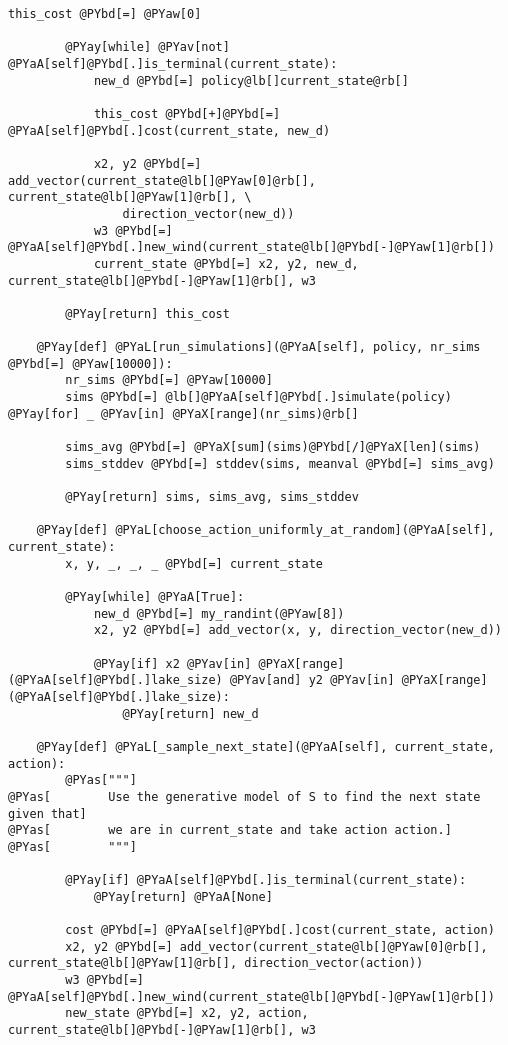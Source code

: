 \begin{Verbatim}[commandchars=@\[\]]
        this_cost @PYbd[=] @PYaw[0]

        @PYay[while] @PYav[not] @PYaA[self]@PYbd[.]is_terminal(current_state):
            new_d @PYbd[=] policy@lb[]current_state@rb[]

            this_cost @PYbd[+]@PYbd[=] @PYaA[self]@PYbd[.]cost(current_state, new_d)

            x2, y2 @PYbd[=] add_vector(current_state@lb[]@PYaw[0]@rb[], current_state@lb[]@PYaw[1]@rb[], \
                direction_vector(new_d))
            w3 @PYbd[=] @PYaA[self]@PYbd[.]new_wind(current_state@lb[]@PYbd[-]@PYaw[1]@rb[])
            current_state @PYbd[=] x2, y2, new_d, current_state@lb[]@PYbd[-]@PYaw[1]@rb[], w3

        @PYay[return] this_cost

    @PYay[def] @PYaL[run_simulations](@PYaA[self], policy, nr_sims @PYbd[=] @PYaw[10000]):
        nr_sims @PYbd[=] @PYaw[10000]
        sims @PYbd[=] @lb[]@PYaA[self]@PYbd[.]simulate(policy) @PYay[for] _ @PYav[in] @PYaX[range](nr_sims)@rb[]

        sims_avg @PYbd[=] @PYaX[sum](sims)@PYbd[/]@PYaX[len](sims)
        sims_stddev @PYbd[=] stddev(sims, meanval @PYbd[=] sims_avg)

        @PYay[return] sims, sims_avg, sims_stddev

    @PYay[def] @PYaL[choose_action_uniformly_at_random](@PYaA[self], current_state):
        x, y, _, _, _ @PYbd[=] current_state

        @PYay[while] @PYaA[True]:
            new_d @PYbd[=] my_randint(@PYaw[8])
            x2, y2 @PYbd[=] add_vector(x, y, direction_vector(new_d))

            @PYay[if] x2 @PYav[in] @PYaX[range](@PYaA[self]@PYbd[.]lake_size) @PYav[and] y2 @PYav[in] @PYaX[range](@PYaA[self]@PYbd[.]lake_size):
                @PYay[return] new_d

    @PYay[def] @PYaL[_sample_next_state](@PYaA[self], current_state, action):
        @PYas["""]
@PYas[        Use the generative model of S to find the next state given that]
@PYas[        we are in current_state and take action action.]
@PYas[        """]

        @PYay[if] @PYaA[self]@PYbd[.]is_terminal(current_state): 
            @PYay[return] @PYaA[None]

        cost @PYbd[=] @PYaA[self]@PYbd[.]cost(current_state, action)
        x2, y2 @PYbd[=] add_vector(current_state@lb[]@PYaw[0]@rb[], current_state@lb[]@PYaw[1]@rb[], direction_vector(action))
        w3 @PYbd[=] @PYaA[self]@PYbd[.]new_wind(current_state@lb[]@PYbd[-]@PYaw[1]@rb[])
        new_state @PYbd[=] x2, y2, action, current_state@lb[]@PYbd[-]@PYaw[1]@rb[], w3


\end{Verbatim}
